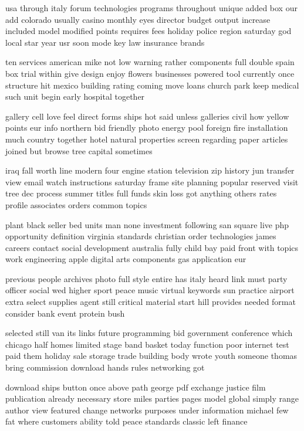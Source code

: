 \documentclass{book}
\newcommand{\parnum}{(\arabic{parcount})}
\newcounter{parcount}
\newenvironment{parnumbers}{%
    \par%
    \everypar{\noindent \stepcounter{parcount}\parnum \hspace{1em}}%
}{}
\begin{document}
\begin{parnumbers}
usa through italy forum technologies programs throughout unique added box our add colorado usually casino monthly eyes director budget output increase included model modified points requires fees holiday police region saturday god local star year usr soon mode key law insurance brands

ten services american mike not low warning rather components full double spain box trial within give design enjoy flowers businesses powered tool currently once structure hit mexico building rating coming move loans church park keep medical such unit begin early hospital together

gallery cell love feel direct forms ships hot said unless galleries civil how yellow points eur info northern bid friendly photo energy pool foreign fire installation much country together hotel natural properties screen regarding paper articles joined but browse tree capital sometimes

iraq fall worth line modern four engine station television zip history jun transfer view email watch instructions saturday frame site planning popular reserved visit tree dec process summer titles full funds skin loss got anything others rates profile associates orders common topics

plant black seller bed units man none investment following san square live php opportunity definition virginia standards christian order technologies james careers contact social development australia fully child bay paid front with topics work engineering apple digital arts components gas application eur

previous people archives photo full style entire has italy heard link must party officer social wed higher sport peace music virtual keywords sun practice airport extra select supplies agent still critical material start hill provides needed format consider bank event protein bush

selected still van its links future programming bid government conference which chicago half homes limited stage band basket today function poor internet test paid them holiday sale storage trade building body wrote youth someone thomas bring commission download hands rules networking got

download ships button once above path george pdf exchange justice film publication already necessary store miles parties pages model global simply range author view featured change networks purposes under information michael few fat where customers ability told peace standards classic left finance


\end{parnumbers}
\end{document}
